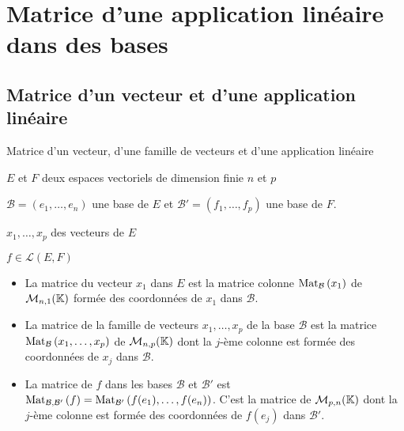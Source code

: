 \section[Matrice d’une a.l.]{Matrice d’une application linéaire dans des bases}

\subsection{Matrice d’un vecteur et d’une application linéaire}

    \begin{defi}{Matrice d’un vecteur, d’une famille de vecteurs et d’une application linéaire}{}
        \begin{soient}
            \item $E$ et $F$ deux espaces vectoriels de dimension finie $n$ et $p$
            \item $\mathcal{B} = (e_1, \ldots, e_n)$ une base de $E$ et $\mathcal{B}' = (f_1,\ldots,f_p)$ une base de $F$.
            \item $x_1,\ldots,x_p$ des vecteurs de $E$
            \item $f \in \mathcal{L}(E,F)$
        \end{soient}
        \begin{itemize}
            \item La matrice du vecteur $x_1$ dans $E$ est la matrice colonne $\text{Mat}_{\mathcal{B}}\left(x_1\right)$ de $\mathcal{M}_{n,1}(\mathbb{K})$ formée des coordonnées de $x_1$ dans $\mathcal{B}$.
            \item La matrice de la famille de vecteurs $x_1,\ldots,x_p$ de la base $\mathcal{B}$ est la matrice $\text{Mat}_{\mathcal{B}}\left(x_1,\ldots,x_p\right)$ de $\mathcal{M}_{n,p}(\mathbb{K})$ dont la $j$-ème colonne est formée des coordonnées de $x_j$ dans $\mathcal{B}$.
            \item La matrice de $f$ dans les bases $\mathcal{B}$ et $\mathcal{B}'$ est $\text{Mat}_{\mathcal{B},\mathcal{B}'}\left(f\right) = \text{Mat}_{\mathcal{B}'}\left(f(e_1),\ldots,f(e_n)\right)$. C’est la matrice de $\mathcal{M}_{p,n}(\mathbb{K})$ dont la $j$-ème colonne est formée des coordonnées de $f(e_j)$ dans $\mathcal{B}'$.
        \end{itemize}
    \end{defi}

